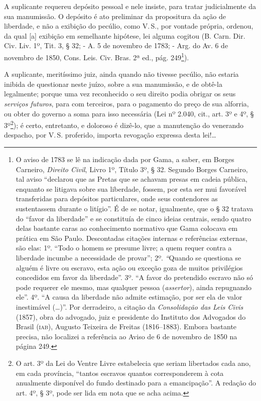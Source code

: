 A suplicante requereu depósito pessoal e nele insiste, para tratar
judicialmente da sua manumissão. O depósito é ato preliminar da
propositura da ação de liberdade, e não a exibição do pecúlio, como V.\,S., por vontade própria, ordenou, da qual {[}a{]} exibição em semelhante
hipótese, lei alguma cogitou (B. Carn. Dir. Civ. Liv. 1º, Tit. 3, § 32;
- A. 5 de novembro de 1783; - Arg. do Av. 6 de novembro de 1850, Cons.
Leis. Civ. Bras. 2ª ed., pág. 249\footnote{ O aviso de 1783 se lê na
  indicação dada por Gama, a saber, em Borges Carneiro, \emph{Direito
  Civil}, Livro 1º, Título 3º, § 32. Segundo Borges Carneiro, tal aviso
  ``declarou que as Pretas que se achavam presas em cadeia pública,
  enquanto se litigava sobre sua liberdade, fossem, por esta ser mui
  favorável transferidas para depósitos particulares, onde seus
  contendores as sustentassem durante o litígio''. É de se notar,
  igualmente, que o § 32 tratava do ``favor da liberdade'' e se constituía
  de cinco ideias centrais, sendo quatro delas bastante caras ao
  conhecimento normativo que Gama colocava em prática em São Paulo.
  Descontadas citações internas e referências externas, são elas: 1º.
  ``Todo o homem se presume livre; a quem requer contra a liberdade
  incumbe a necessidade de provar''; 2º. \emph{``}Quando se questiona se
  alguém é livre ou escravo, esta ação ou exceção goza de muitos
  privilégios concedidos em favor da liberdade''. 3º. ``A favor do
  pretendido escravo não só pode requerer ele mesmo, mas qualquer pessoa
  (\emph{assertor}), ainda repugnando ele''. 4º. ``A causa da liberdade
  não admite estimação, por ser ela de valor inestimável (\ldots{})''. Por
  derradeiro, a citação da \emph{Consolidação das Leis Civis} (1857),
  obra do advogado, juiz e presidente do Instituto dos Advogados do
  Brasil (\textsc{iab}), Augusto Teixeira de Freitas (1816--1883). Embora bastante
  precisa, não localizei a referência ao Aviso de 6 de novembro de 1850
  na página 249.}).

A suplicante, meritíssimo juiz, ainda quando não tivesse pecúlio, não
estaria inibida de questionar neste juízo, sobre a sua manumissão, e de
obtê-la legalmente; porque uma vez reconhecido o seu direito podia
obrigar os seus \emph{serviços futuros}, para com terceiros, para o
pagamento do preço de sua alforria, ou obter do governo a soma para isso
necessária (Lei nº 2.040, cit., art. 3º e 4º, § 3º\footnote{ O art. 3º
  da Lei do Ventre Livre estabelecia que seriam libertados cada ano, em
  cada província, ``tantos escravos quantos corresponderem à cota
  anualmente disponível do fundo destinado para a emancipação''. A
  redação do art. 4º, § 3º, pode ser lida em nota que se acha acima.});
é certo, entretanto, e doloroso é dizê-lo, que a manutenção do venerando
despacho, por V.\,S. proferido, importa revogação expressa desta lei!\ldots{}

